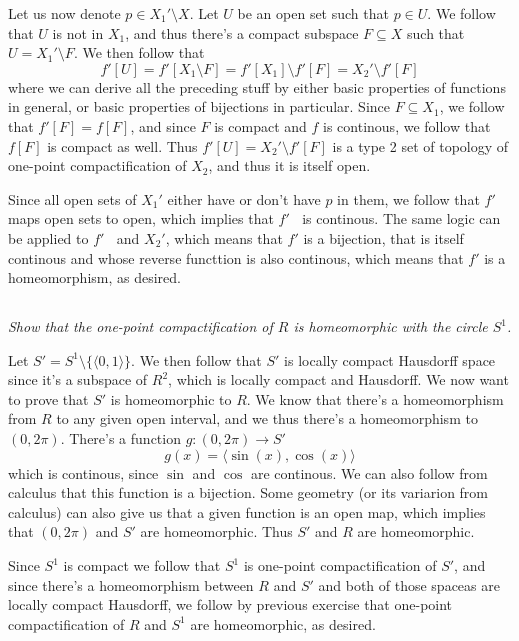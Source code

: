 \documentclass[11pt,oneside,titlepage]{book}
\DeclareMathOperator \inv {^{-1}}
\newcommand{\eangle}[1]{\langle #1 \rangle}
\newcommand{\set}[1]{\{ #1 \}}
\begin{document}
Let us now denote $p \in X_1' \setminus X$. Let $U$ be an open set such that $p \in U$.
We follow that $U$ is not in $X_1$, and thus there's a compact subspace $F \subseteq X$ such
that $U = X_1' \setminus F$. We then follow that
$$f'[U] = f'[X_1 \setminus F] = f'[X_1] \setminus f'[F] = X_2' \setminus f'[F]$$
where we can derive all the preceding stuff by either basic properties of functions in general,
or basic properties of bijections in particular. 
Since $F \subseteq X_1$, we follow that $f'[F] = f[F]$, and since $F$ is compact and $f$
is continous, we follow that $f[F]$ is compact as well. Thus $f'[U] = X_2' \setminus f'[F]$
is a type 2 set of topology of one-point compactification of $X_2$, and thus it is itself open.

Since all open sets of $X_1'$ either have or don't have $p$ in them, we follow that $f'$
maps open sets to open, which implies that $f'\inv$ is continous. The same logic
can be applied to $f'\inv$ and $X_2'$, which means that $f'$ is a bijection, that is itself
continous and whose reverse functtion is also continous, which means that $f'$ is a homeomorphism,
as desired.

\subsection{}

\textit{Show that the one-point compactification of $R$ is homeomorphic with the circle $S^1$.}

Let $S' = S^1 \setminus \set{\eangle{0, 1}}$. We then follow that $S'$ is locally compact
Hausdorff space since it's a subspace of $R^2$, which is locally compact and Hausdorff. We
now want to prove that $S'$ is homeomorphic to $R$. We know that there's a homeomorphism
from $R$ to any given open interval, and we thus there's a homeomorphism to $(0, 2\pi)$.
There's a function $g: (0, 2\pi) \to S'$
$$g(x) = \eangle{\sin(x), \cos(x)}$$
which is continous, since $\sin$ and $\cos$ are continous. We can also follow from calculus that
this function is a bijection. Some geometry (or its variarion from calculus) can also give us that
a given function is an open map, which implies that $(0, 2\pi)$ and $S'$ are homeomorphic. Thus
$S'$ and $R$ are homeomorphic.

Since $S^1$ is compact we follow that $S^1$ is one-point
compactification of $S'$, and since there's a homeomorphism between $R$ and $S'$ and
both of those spaceas are locally compact Hausdorff, we follow by previous exercise that
one-point compactification of $R$ and $S^1$ are homeomorphic, as desired.
\end{document}
